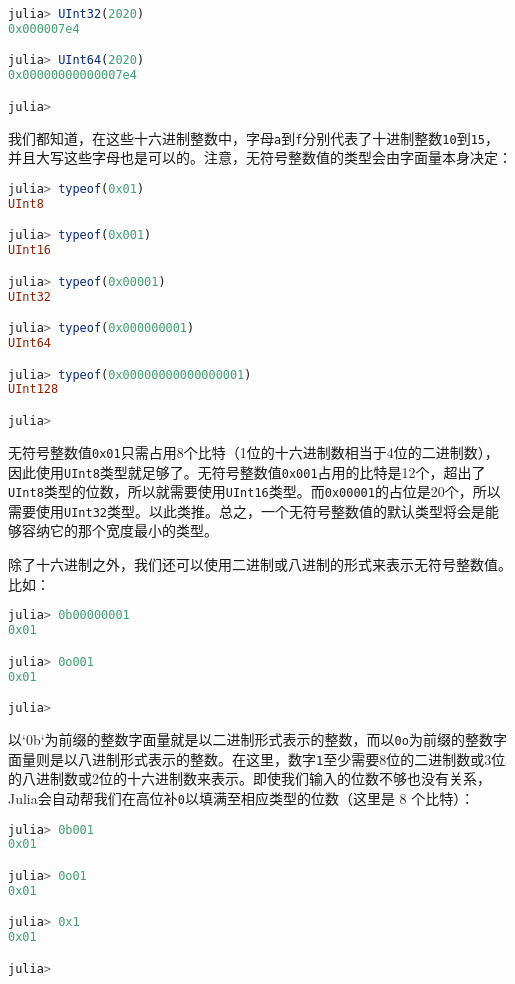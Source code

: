 \begin{lstlisting}[language=julia]
julia> UInt32(2020)
0x000007e4

julia> UInt64(2020)
0x00000000000007e4

julia> 
\end{lstlisting}

我们都知道，在这些十六进制整数中，字母\verb|a|到\verb|f|分别代表了十进制整数\verb|10|到\verb|15|，并且大写这些字母也是可以的。注意，无符号整数值的类型会由字面量本身决定：

\begin{lstlisting}[language=julia]
julia> typeof(0x01)
UInt8

julia> typeof(0x001)
UInt16

julia> typeof(0x00001)
UInt32

julia> typeof(0x000000001)
UInt64

julia> typeof(0x00000000000000001)
UInt128

julia> 
\end{lstlisting}

无符号整数值\verb|0x01|只需占用8个比特（1位的十六进制数相当于4位的二进制数），因此使用\verb|UInt8|类型就足够了。无符号整数值\verb|0x001|占用的比特是12个，超出了\verb|UInt8|类型的位数，所以就需要使用\verb|UInt16|类型。而\verb|0x00001|的占位是20个，所以需要使用\verb|UInt32|类型。以此类推。总之，一个无符号整数值的默认类型将会是能够容纳它的那个宽度最小的类型。

除了十六进制之外，我们还可以使用二进制或八进制的形式来表示无符号整数值。比如：

\begin{lstlisting}[language=julia]
julia> 0b00000001
0x01

julia> 0o001
0x01

julia> 
\end{lstlisting}

以`0b`为前缀的整数字面量就是以二进制形式表示的整数，而以\verb|0o|为前缀的整数字面量则是以八进制形式表示的整数。在这里，数字\verb|1|至少需要8位的二进制数或3位的八进制数或2位的十六进制数来表示。即使我们输入的位数不够也没有关系，Julia会自动帮我们在高位补\verb|0|以填满至相应类型的位数（这里是 8 个比特）：

\begin{lstlisting}[language=julia]
julia> 0b001
0x01

julia> 0o01
0x01

julia> 0x1
0x01

julia>
\end{lstlisting}

